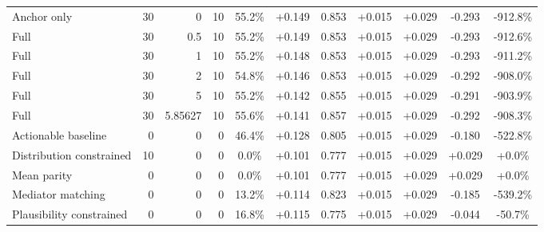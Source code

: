 \begin{table}[htbp]
\begin{tabular}{lrrrccccccc}
Anchor only & 30 & 0 & 10 & 55.2\% & +0.149 & 0.853 & +0.015 & +0.029 & -0.293 & -912.8\% \\
Full & 30 & 0.5 & 10 & 55.2\% & +0.149 & 0.853 & +0.015 & +0.029 & -0.293 & -912.6\% \\
Full & 30 & 1 & 10 & 55.2\% & +0.148 & 0.853 & +0.015 & +0.029 & -0.293 & -911.2\% \\
Full & 30 & 2 & 10 & 54.8\% & +0.146 & 0.853 & +0.015 & +0.029 & -0.292 & -908.0\% \\
Full & 30 & 5 & 10 & 55.2\% & +0.142 & 0.855 & +0.015 & +0.029 & -0.291 & -903.9\% \\
Full & 30 & 5.85627 & 10 & 55.6\% & +0.141 & 0.857 & +0.015 & +0.029 & -0.292 & -908.3\% \\
Actionable baseline & 0 & 0 & 0 & 46.4\% & +0.128 & 0.805 & +0.015 & +0.029 & -0.180 & -522.8\% \\
Distribution constrained & 10 & 0 & 0 & 0.0\% & +0.101 & 0.777 & +0.015 & +0.029 & +0.029 & +0.0\% \\
Mean parity & 0 & 0 & 0 & 0.0\% & +0.101 & 0.777 & +0.015 & +0.029 & +0.029 & +0.0\% \\
Mediator matching & 0 & 0 & 0 & 13.2\% & +0.114 & 0.823 & +0.015 & +0.029 & -0.185 & -539.2\% \\
Plausibility constrained & 0 & 0 & 0 & 16.8\% & +0.115 & 0.775 & +0.015 & +0.029 & -0.044 & -50.7\% \\
\bottomrule
\end{tabular}
\end{table}